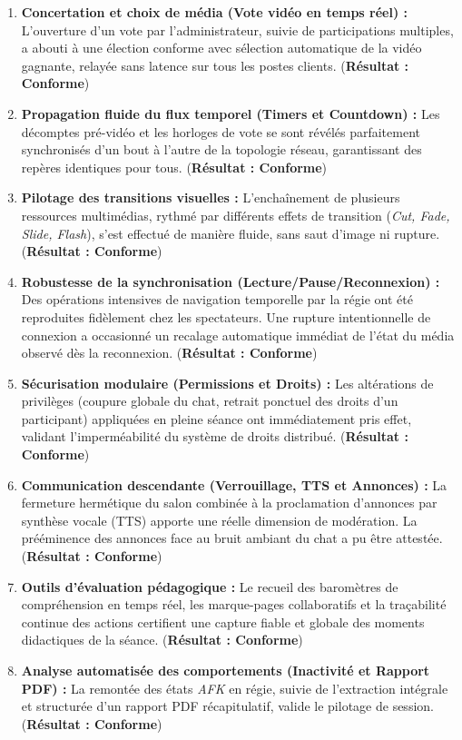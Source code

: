 \documentclass[11pt,a4paper]{report}
\begin{document}
\begin{enumerate}
    \item \textbf{Concertation et choix de média (Vote vidéo en temps réel) :} L'ouverture d'un vote par l'administrateur, suivie de participations multiples, a abouti à une élection conforme avec sélection automatique de la vidéo gagnante, relayée sans latence sur tous les postes clients. (\textbf{Résultat : Conforme})
    \item \textbf{Propagation fluide du flux temporel (Timers et Countdown) :} Les décomptes pré-vidéo et les horloges de vote se sont révélés parfaitement synchronisés d'un bout à l'autre de la topologie réseau, garantissant des repères identiques pour tous. (\textbf{Résultat : Conforme})
    \item \textbf{Pilotage des transitions visuelles :} L'enchaînement de plusieurs ressources multimédias, rythmé par différents effets de transition (\textit{Cut, Fade, Slide, Flash}), s'est effectué de manière fluide, sans saut d'image ni rupture. (\textbf{Résultat : Conforme})
    \item \textbf{Robustesse de la synchronisation (Lecture/Pause/Reconnexion) :} Des opérations intensives de navigation temporelle par la régie ont été reproduites fidèlement chez les spectateurs. Une rupture intentionnelle de connexion a occasionné un recalage automatique immédiat de l'état du média observé dès la reconnexion. (\textbf{Résultat : Conforme})
    \item \textbf{Sécurisation modulaire (Permissions et Droits) :} Les altérations de privilèges (coupure globale du chat, retrait ponctuel des droits d'un participant) appliquées en pleine séance ont immédiatement pris effet, validant l'imperméabilité du système de droits distribué. (\textbf{Résultat : Conforme})
    \item \textbf{Communication descendante (Verrouillage, TTS et Annonces) :} La fermeture hermétique du salon combinée à la proclamation d'annonces par synthèse vocale (TTS) apporte une réelle dimension de modération. La prééminence des annonces face au bruit ambiant du chat a pu être attestée. (\textbf{Résultat : Conforme})
    \item \textbf{Outils d'évaluation pédagogique :} Le recueil des baromètres de compréhension en temps réel, les marque-pages collaboratifs et la traçabilité continue des actions certifient une capture fiable et globale des moments didactiques de la séance. (\textbf{Résultat : Conforme})
    \item \textbf{Analyse automatisée des comportements (Inactivité et Rapport PDF) :} La remontée des états \textit{AFK} en régie, suivie de l'extraction intégrale et structurée d'un rapport PDF récapitulatif, valide le pilotage de session. (\textbf{Résultat : Conforme})

\end{enumerate}
\end{document}
